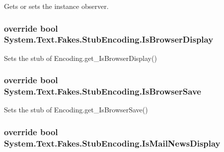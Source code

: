 Gets or sets the instance observer.

\hypertarget{class_system_1_1_text_1_1_fakes_1_1_stub_encoding_ae4fb0a65c2e8c84f6c940738799b4f98}{
\subsubsection[{Is\-Browser\-Display}]{\setlength{\rightskip}{0pt plus 5cm}override bool System.\-Text.\-Fakes.\-Stub\-Encoding.\-Is\-Browser\-Display\hspace{0.3cm}{\ttfamily [get]}}}\label{class_system_1_1_text_1_1_fakes_1_1_stub_encoding_ae4fb0a65c2e8c84f6c940738799b4f98}


Sets the stub of Encoding.\-get\-\_\-\-Is\-Browser\-Display()

\hypertarget{class_system_1_1_text_1_1_fakes_1_1_stub_encoding_a211a0374e3abaf82f64300ef914f7642}{
\subsubsection[{Is\-Browser\-Save}]{\setlength{\rightskip}{0pt plus 5cm}override bool System.\-Text.\-Fakes.\-Stub\-Encoding.\-Is\-Browser\-Save\hspace{0.3cm}{\ttfamily [get]}}}\label{class_system_1_1_text_1_1_fakes_1_1_stub_encoding_a211a0374e3abaf82f64300ef914f7642}


Sets the stub of Encoding.\-get\-\_\-\-Is\-Browser\-Save()

\hypertarget{class_system_1_1_text_1_1_fakes_1_1_stub_encoding_ad0df936f97eaf927f919d72aa76a2ca3}{
\subsubsection[{Is\-Mail\-News\-Display}]{\setlength{\rightskip}{0pt plus 5cm}override bool System.\-Text.\-Fakes.\-Stub\-Encoding.\-Is\-Mail\-News\-Display\hspace{0.3cm}{\ttfamily [get]}}}\label{class_system_1_1_text_1_1_fakes_1_1_stub_encoding_ad0df936f97eaf927f919d72aa76a2ca3}


